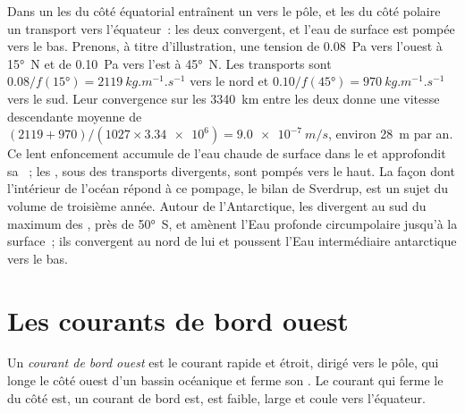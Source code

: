 Dans un  les  du côté équatorial entraînent un  vers le pôle, et les  du côté polaire un transport
vers l'équateur~: les deux convergent, et l'eau de surface est pompée vers le bas. Prenons,
à titre d'illustration, une tension de \qty{0.08}{Pa} vers l'ouest à \ang{15}~N et de
\qty{0.10}{Pa} vers l'est à \ang{45}~N. Les transports sont
$0.08/f(\ang{15}) = \qty{2119}{kg.m^{-1}.s^{-1}}$ vers le nord et $0.10/f(\ang{45}) =
\qty{970}{kg.m^{-1}.s^{-1}}$ vers le sud. Leur convergence sur les \qty{3340}{km}
entre les deux  donne une vitesse descendante moyenne de
$(2119 + 970)/(1027 \times \num{3.34e6}) = \qty{9.0e-7}{m/s}$, environ \qty{28}{m}
par an. Ce lent enfoncement accumule de l'eau chaude de surface dans le  et approfondit sa
~; les , sous des transports divergents, sont pompés vers le haut. La
façon dont l'intérieur de l'océan répond à ce pompage, le bilan de Sverdrup, est un
sujet du volume de troisième année. Autour de l'Antarctique, les  divergent au sud
du maximum des , près de \ang{50}~S, et amènent l'Eau profonde circumpolaire
jusqu'à la surface~; ils convergent au nord de lui et poussent l'Eau intermédiaire antarctique
vers le bas.

\section{Les courants de bord ouest}\label{sec:b1:ocean-circulation:wbc}

\begin{definition}\label{def:b1:ocean-circulation:wbc}
Un \emph{courant de bord ouest} est le courant rapide et
étroit, dirigé vers le pôle, qui longe le côté ouest d'un bassin océanique et
ferme son . Le courant qui ferme le  du côté est,
un courant de bord est, est faible, large et coule vers l'équateur.
\end{definition}

